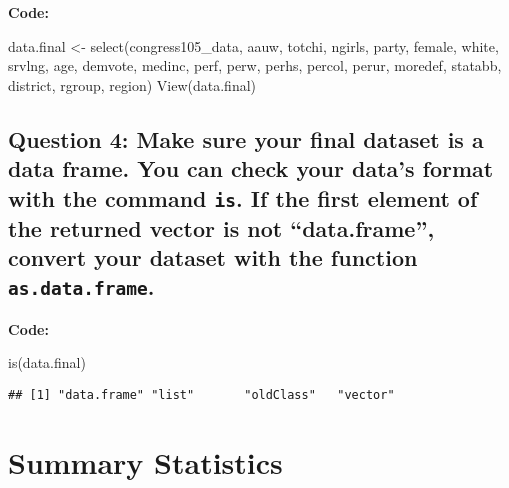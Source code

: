 \documentclass[
]{article}
\newenvironment{Shaded}{\begin{snugshade}}{\end{snugshade}}
\newcommand{\FunctionTok}[1]{\textcolor[rgb]{0.00,0.00,0.00}{#1}}
\newcommand{\NormalTok}[1]{#1}
\newcommand{\OtherTok}[1]{\textcolor[rgb]{0.56,0.35,0.01}{#1}}
\begin{document}
\textbf{Code:}

\begin{Shaded}
\begin{Highlighting}[]
\NormalTok{data.final }\OtherTok{\textless{}{-}} \FunctionTok{select}\NormalTok{(congress105\_data, aauw, totchi, ngirls, party, female, white, srvlng, age, demvote, medinc, perf, perw, perhs, percol, perur, moredef, statabb, district, rgroup, region)}
\FunctionTok{View}\NormalTok{(data.final)}
\end{Highlighting}
\end{Shaded}

\hypertarget{question-4-make-sure-your-final-dataset-is-a-data-frame.-you-can-check-your-datas-format-with-the-command-is.-if-the-first-element-of-the-returned-vector-is-not-data.frame-convert-your-dataset-with-the-function-as.data.frame.}{%
\subsection{\texorpdfstring{Question 4: Make sure your final dataset is
a data frame. You can check your data's format with the command
\texttt{is}. If the first element of the returned vector is not
``data.frame'', convert your dataset with the function
\texttt{as.data.frame}.}{Question 4: Make sure your final dataset is a data frame. You can check your data's format with the command is. If the first element of the returned vector is not ``data.frame'', convert your dataset with the function as.data.frame.}}\label{question-4-make-sure-your-final-dataset-is-a-data-frame.-you-can-check-your-datas-format-with-the-command-is.-if-the-first-element-of-the-returned-vector-is-not-data.frame-convert-your-dataset-with-the-function-as.data.frame.}}

\textbf{Code:}

\begin{Shaded}
\begin{Highlighting}[]
\FunctionTok{is}\NormalTok{(data.final)}
\end{Highlighting}
\end{Shaded}

\begin{verbatim}
## [1] "data.frame" "list"       "oldClass"   "vector"
\end{verbatim}

\hypertarget{summary-statistics}{%
\section{Summary Statistics}\label{summary-statistics}}
\end{document}
